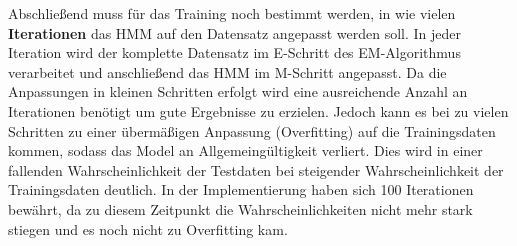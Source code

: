 \documentclass[conference]{IEEEtran}
\begin{document}
Abschließend muss für das Training noch bestimmt werden, in wie vielen \textbf{Iterationen} das HMM auf den Datensatz angepasst werden soll. 
In jeder Iteration wird der komplette Datensatz im E-Schritt des EM-Algorithmus verarbeitet und anschließend das HMM im M-Schritt angepasst.
Da die Anpassungen in kleinen Schritten erfolgt wird eine ausreichende Anzahl an Iterationen benötigt um gute Ergebnisse zu erzielen.
Jedoch kann es bei zu vielen Schritten zu einer übermäßigen Anpassung (Overfitting) auf die Trainingsdaten kommen, sodass das Model an Allgemeingültigkeit verliert.
Dies wird in einer fallenden Wahrscheinlichkeit der Testdaten bei steigender Wahrscheinlichkeit der Trainingsdaten deutlich.
In der Implementierung haben sich 100 Iterationen bewährt, da zu diesem Zeitpunkt die Wahrscheinlichkeiten nicht mehr stark stiegen und es noch nicht zu Overfitting kam. 
\end{document}
